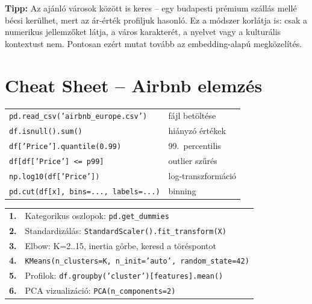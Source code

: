 \documentclass[11pt,a4paper]{article}
\newcommand{\tip}[1]{%
  \vspace{3pt}%
  \begin{tcolorbox}[tipstyle]%
  \textbf{\textcolor{tipborder}{Tipp:}} #1%
  \end{tcolorbox}\vspace{2pt}}
\begin{document}
\tip{Az ajánló városok között is keres -- egy budapesti prémium szállás mellé bécsi kerülhet,
mert az ár-érték profiljuk hasonló. Ez a módszer korlátja is: csak a numerikus jellemzőket látja,
a város karakterét, a nyelvet vagy a kulturális kontextust nem.
Pontosan ezért mutat tovább az embedding-alapú megközelítés.}

\newpage
\section*{Cheat Sheet -- Airbnb elemzés}

\begin{tcolorbox}[cheatstyle, title={Adatbetöltés és tisztítás}]
\begin{tabularx}{\linewidth}{@{}lX@{}}
\texttt{pd.read\_csv('airbnb\_europe.csv')} & fájl betöltése \\[2pt]
\texttt{df.isnull().sum()} & hiányzó értékek \\[2pt]
\texttt{df['Price'].quantile(0.99)} & 99.\ percentilis \\[2pt]
\texttt{df[df['Price'] <= p99]} & outlier szűrés \\[2pt]
\texttt{np.log10(df['Price'])} & log-transzformáció \\[2pt]
\texttt{pd.cut(df[x], bins=..., labels=...)} & binning \\
\end{tabularx}
\end{tcolorbox}

\smallskip

\begin{tcolorbox}[cheatstyle, title={K-means klaszterezés -- lépések}]
\begin{tabularx}{\linewidth}{@{}lX@{}}
\textbf{1.} & Kategorikus oszlopok: \texttt{pd.get\_dummies} \\[2pt]
\textbf{2.} & Standardizálás: \texttt{StandardScaler().fit\_transform(X)} \\[2pt]
\textbf{3.} & Elbow: K=2..15, inertia görbe, keresd a töréspontot \\[2pt]
\textbf{4.} & \texttt{KMeans(n\_clusters=K, n\_init='auto', random\_state=42)} \\[2pt]
\textbf{5.} & Profilok: \texttt{df.groupby('cluster')[features].mean()} \\[2pt]
\textbf{6.} & PCA vizualizáció: \texttt{PCA(n\_components=2)} \\
\end{tabularx}
\end{tcolorbox}
\end{document}
